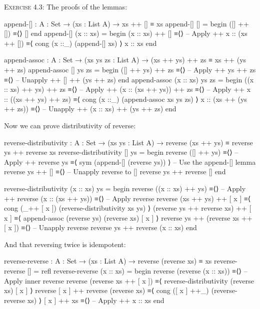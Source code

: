\documentclass{article}
\begin{document}
\noindent
\textsc{Exercise 4.3}: The proofs of the lemmas:

\begin{code}
append-[] : {A : Set} → (xs : List A) → xs ++ [] ≡ xs
append-[] [] = begin ([] ++ []) ≡⟨⟩ [] end
append-[] (x :: xs) =
    begin
      (x :: xs) ++ []
    ≡⟨⟩ -- Apply ++
      x :: (xs ++ [])
    ≡⟨ cong (x ::_) (append-[] xs) ⟩
      x :: xs
    end

append-assoc : {A : Set} → (xs ys zs : List A)
    → (xs ++ ys) ++ zs ≡ xs ++ (ys ++ zs)
append-assoc [] ys zs =
    begin
      ([] ++ ys) ++ zs
    ≡⟨⟩ -- Apply ++
      ys ++ zs
    ≡⟨⟩ -- Unapply ++
      [] ++ (ys ++ zs)
    end
append-assoc (x :: xs) ys zs =
    begin
      ((x :: xs) ++ ys) ++ zs
    ≡⟨⟩ -- Apply ++
      (x :: (xs ++ ys)) ++ zs
    ≡⟨⟩ -- Apply ++
      x :: ((xs ++ ys) ++ zs)
    ≡⟨ cong (x ::_) (append-assoc xs ys zs) ⟩
      x :: (xs ++ (ys ++ zs))
    ≡⟨⟩ -- Unapply ++
      (x :: xs) ++ (ys ++ zs)
    end
\end{code}

\noindent
Now we can prove distributivity of reverse:

\begin{code}
reverse-distributivity : {A : Set} → (xs ys : List A)
    → reverse (xs ++ ys) ≡ reverse ys ++ reverse xs
reverse-distributivity [] ys =
    begin
      reverse ([] ++ ys)
    ≡⟨⟩ -- Apply ++
      reverse ys
    ≡⟨ sym (append-[] (reverse ys)) ⟩ -- Use the append-[] lemma
      reverse ys ++ []
    ≡⟨⟩ -- Unapply reverse to []
      reverse ys ++ reverse []
    end
\end{code}
\begin{code}
reverse-distributivity (x :: xs) ys =
    begin
      reverse ((x :: xs) ++ ys)
    ≡⟨⟩ -- Apply ++
      reverse (x :: (xs ++ ys))
    ≡⟨⟩ -- Apply reverse
      reverse (xs ++ ys) ++ [ x ]
    ≡⟨ cong (_++ [ x ]) (reverse-distributivity xs ys) ⟩
      (reverse ys ++ reverse xs) ++ [ x ]
    ≡⟨ append-assoc (reverse ys) (reverse xs) [ x ] ⟩
      reverse ys ++ (reverse xs ++ [ x ])
    ≡⟨⟩ -- Unapply reverse
      reverse ys ++ reverse (x :: xs)
    end
\end{code}

\noindent
And that reversing twice is idempotent:

\begin{code}
reverse-reverse : {A : Set} → (xs : List A) → reverse (reverse xs) ≡ xs
reverse-reverse [] = refl
reverse-reverse (x :: xs) =
    begin
      reverse (reverse (x :: xs))
    ≡⟨⟩ -- Apply inner reverse
      reverse (reverse xs ++ [ x ])
    ≡⟨ reverse-distributivity (reverse xs) [ x ] ⟩
      reverse [ x ] ++ reverse (reverse xs)
    ≡⟨ cong ([ x ] ++_) (reverse-reverse xs) ⟩
      [ x ] ++ xs
    ≡⟨⟩ -- Apply ++
      x :: xs
    end
\end{code}
\end{document}
